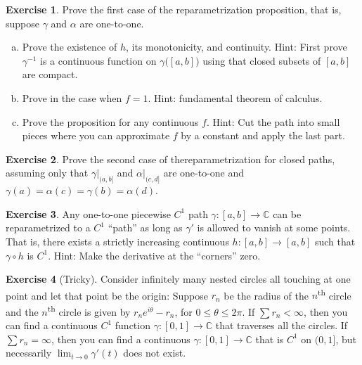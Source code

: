 \documentclass[12pt,openany]{book}
\newcommand{\C}{{\mathbb{C}}}
\theoremstyle{plain}
\theoremstyle{remark}
\theoremstyle{definition}
\newenvironment{exbox}{%
    \def\FrameCommand{\vrule width 1pt \relax\hspace {10pt}}%
    \MakeFramed {\advance \hsize -\width \FrameRestore }%
}{%
    \endMakeFramed
}
\newenvironment{exparts}{%
    \leavevmode\begin{enumerate}[a),noitemsep,topsep=0pt,parsep=0pt,partopsep=0pt]
}{%
    \end{enumerate}
}
\theoremstyle{exercise}
\newtheorem{exercise}{Exercise}[section]
\theoremstyle{example}
\begin{document}
\begin{exbox}
\begin{exercise}
Prove the first case of the reparametrization proposition, that is,
suppose $\gamma$ and $\alpha$ are one-to-one.
\begin{exparts}
\item
Prove the existence of $h$, its monotonicity, and continuity.
Hint: First prove $\gamma^{-1}$ is a continuous function on
$\gamma\bigl([a,b]\bigr)$ using that closed subsets of $[a,b]$
are compact.
\item
Prove in the case when $f=1$.
Hint: fundamental theorem of calculus.
\item
Prove the proposition for any continuous $f$.
Hint: Cut the path into small pieces where
you can approximate $f$ by a constant and apply the
last part.
\end{exparts}
\end{exercise}

\begin{exercise}
Prove the second case of thereparametrization for closed paths,
assuming only that $\gamma|_{(a,b]}$ and
$\alpha|_{(c,d]}$ are one-to-one and
$\gamma(a)=\alpha(c)=\gamma(b)=\alpha(d)$.
\end{exercise}

\begin{exercise}
Any one-to-one piecewise $C^1$ path $\gamma \colon [a,b] \to \C$
can be reparametrized
to a $C^1$ ``path'' as long as $\gamma'$ is allowed to vanish at some points.
That is, there exists a strictly increasing
continuous $h \colon [a,b] \to [a,b]$ such that
$\gamma \circ h$ is $C^1$.
Hint: Make the derivative at the ``corners'' zero.
\end{exercise}

\begin{exercise}[Tricky]
Consider infinitely many nested circles all touching at one point
and let that point be the origin: Suppose $r_n$ be the radius of the
$n$\textsuperscript{th}
circle and the $n$\textsuperscript{th} circle is given by $r_n e^{i\theta} - r_n$, for $0 \leq
\theta \leq 2\pi$.  If $\sum r_n < \infty$, then you can find a continuous
$C^1$ function $\gamma \colon
[0,1] \to \C$ that traverses all the circles.  If $\sum r_n = \infty$, then
you can find a continuous $\gamma \colon [0,1] \to \C$ that is $C^1$ on
$(0,1]$, but necessarily $\lim_{t \to 0} \gamma'(t)$ does not exist.
\end{exercise}
\end{exbox}
\end{document}
